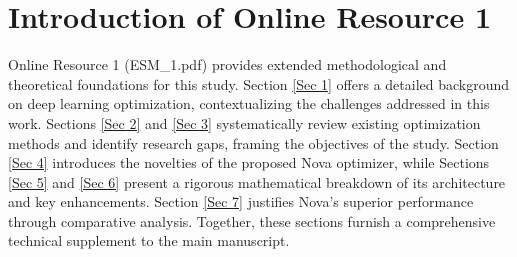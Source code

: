 \documentclass{article}
\begin{document}
%
%
%
%
%
%
%

\tableofcontents



\newpage

\section*{Introduction of Online Resource 1 }

Online Resource 1 (ESM\_1.pdf) provides extended methodological and theoretical foundations for this study. Section \ref{Sec 1} offers a detailed background on deep learning optimization, contextualizing the challenges addressed in this work. Sections \ref{Sec  2} and \ref{Sec 3} systematically review existing optimization methods and identify research gaps, framing the objectives of the study. Section \ref{Sec 4} introduces the novelties of the proposed Nova optimizer, while Sections \ref{Sec 5} and \ref{Sec 6} present a rigorous mathematical breakdown of its architecture and key enhancements. Section \ref{Sec 7} justifies Nova’s superior performance through comparative analysis. Together, these sections furnish a comprehensive technical supplement to the main manuscript.
\end{document}
